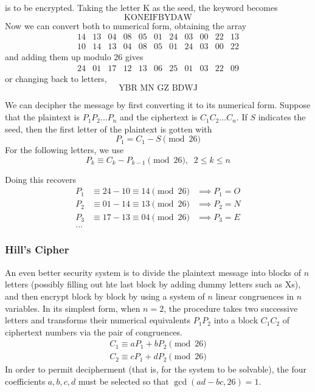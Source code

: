\documentclass{article}
\begin{document}
is to be encrypted. Taking the letter K as the seed, the keyword becomes
\begin{equation}
  \text{KONEIFBYDAW}
\end{equation}
Now we can convert both to numerical form, obtaining the array
\begin{equation}
  \begin{array}{ccccccccccc}
      14&13&04&08&05&01&24&03&00&22&13\\
      10&14&13&04&08&05&01&24&03&00&22
  \end{array}
\end{equation}
and adding them up modulo $26$ gives
\begin{equation}
  \begin{array}{ccccccccccc}
       24&01&17&12&13&06&25&01&03&22&09
  \end{array}
\end{equation}
or changing back to letters, 
\begin{equation}
  \text{YBR MN GZ BDWJ}
\end{equation}

We can decipher the message by first converting it to its numerical form. Suppose that the plaintext is $P_1 P_2 ... P_n$ and the ciphertext is $C_1 C_2 ... C_n$. If $S$ indicates the seed, then the first letter of the plaintext is gotten with
\begin{equation}
  P_1 = C_1 - S \pmod{26}
\end{equation}
For the following letters, we use 
\begin{equation}
  P_k \equiv C_k - P_{k-1} \pmod{26}, \;\; 2 \leq k \leq n
\end{equation}

Doing this recovers 
\begin{align*}
    P_1 &\equiv 24 - 10 \equiv 14 \pmod{26} & \implies P_1 = O\\
    P_2 &\equiv 01-14 \equiv 13 \pmod{26} & \implies P_2 = N\\
    P_3 &\equiv 17 - 13 \equiv 04 \pmod{26} & \implies P_3 = E \\
    ...
\end{align*}

\subsubsection{Hill's Cipher}
An even better security system is to divide the plaintext message into blocks of $n$ letters (possibly filling out hte last block by adding dummy letters such as Xs), and then encrypt block by block by using a system of $n$ linear congruences in $n$ variables. In its simplest form, when $n = 2$, the procedure takes two successive letters and transforms their numerical equivalents $P_1 P_2$ into a block $C_1 C_2$ of ciphertext numbers via the pair of congruences. 
\begin{align*}
    C_1 \equiv a P_1 + b P_2 \pmod{26} \\
    C_2 \equiv c P_1 + d P_2 \pmod{26}
\end{align*}
In order to permit decipherment (that is, for the system to be solvable), the four coefficients $a, b, c, d$ must be selected so that $\gcd(ad-bc, 26) = 1$. 
\end{document}
